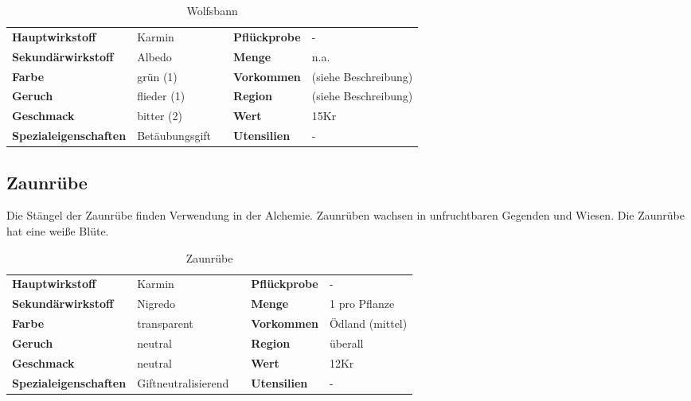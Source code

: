 \begin{table}[H] 
\begin{center} 
\begin{tabular}{|l|l|p{1cm}|l|l|} 
  	\cline{1-2} \cline{4-5} 
  	\textbf{Hauptwirkstoff} & Karmin && \textbf{Pflückprobe} & - \\ \cline{1-2} \cline{4-5} 
  	\textbf{Sekundärwirkstoff} & Albedo && \textbf{Menge} & n.a. \\ \cline{1-2} \cline{4-5} 
  	\textbf{Farbe} & grün (1) && \textbf{Vorkommen} & (siehe Beschreibung) \\ \cline{1-2} \cline{4-5} 
  	\textbf{Geruch} & flieder (1) && \textbf{Region} & (siehe Beschreibung) \\ \cline{1-2} \cline{4-5} 
  	\textbf{Geschmack} & bitter (2) && \textbf{Wert} & 15Kr \\ \cline{1-2} \cline{4-5} 
  	\textbf{Spezialeigenschaften} & Betäubungsgift && \textbf{Utensilien} & - \\ \cline{1-2} \cline{4-5} 
\end{tabular} 
\end{center} 
\caption{Wolfsbann} 
\label{tab:wolfsbann} 
\end{table}

\subsection{Zaunrübe}
Die Stängel der Zaunrübe finden Verwendung in der Alchemie. Zaunrüben wachsen in unfruchtbaren Gegenden und Wiesen. Die Zaunrübe hat eine weiße Blüte.

\begin{table}[H] 
\begin{center} 
\begin{tabular}{|l|l|p{1cm}|l|l|} 
  	\cline{1-2} \cline{4-5} 
  	\textbf{Hauptwirkstoff} & Karmin && \textbf{Pflückprobe} & - \\ \cline{1-2} \cline{4-5} 
  	\textbf{Sekundärwirkstoff} & Nigredo && \textbf{Menge} & 1 pro Pflanze \\ \cline{1-2} \cline{4-5} 
  	\textbf{Farbe} & transparent && \textbf{Vorkommen} & Ödland (mittel) \\ \cline{1-2} \cline{4-5} 
  	\textbf{Geruch} & neutral && \textbf{Region} & überall \\ \cline{1-2} \cline{4-5} 
  	\textbf{Geschmack} & neutral && \textbf{Wert} & 12Kr \\ \cline{1-2} \cline{4-5} 
  	\textbf{Spezialeigenschaften} & Giftneutralisierend && \textbf{Utensilien} & - \\ \cline{1-2} \cline{4-5} 
\end{tabular} 
\end{center} 
\caption{Zaunrübe} 
\label{tab:zaunruebe} 
\end{table}


